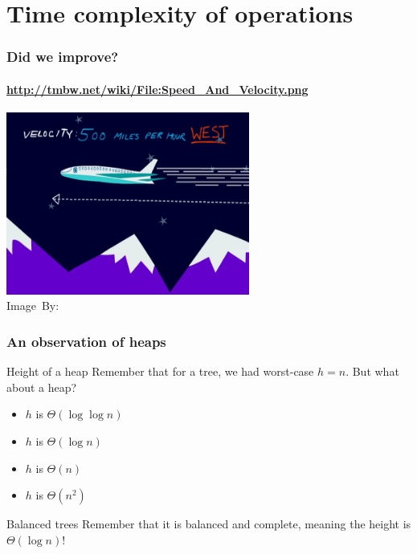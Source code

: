 \section{Time complexity of operations}
\label{sec:time_complexity_of_operations}

\begin{frame}
	\frametitle{Did we improve?}
	\framesubtitle{\url{http://tmbw.net/wiki/File:Speed_And_Velocity.png}}
	\begin{center}
		\includegraphics[width=0.6\textwidth]{figures/speed.png}\\
		\hspace*{15pt}\hbox{\scriptsize Image By:}
	\end{center}
\end{frame}

\begin{frame}
	\frametitle{An observation of heaps}
	
	\begin{questionblock}{Height of a heap}
		Remember that for a tree, we had worst-case $h = n$. But what about a heap?
		\begin{itemize}
			\item $h$ is $\Theta(\log \log n)$
			\item $h$ is $\Theta(\log n)$
			\item $h$ is $\Theta(n)$
			\item $h$ is $\Theta(n^2)$
		\end{itemize}
	\end{questionblock}
	\pause
	\begin{answerblock}{Balanced trees}
		Remember that it is balanced and complete, meaning the height is $\Theta(\log n)$!
	\end{answerblock}
\end{frame}

